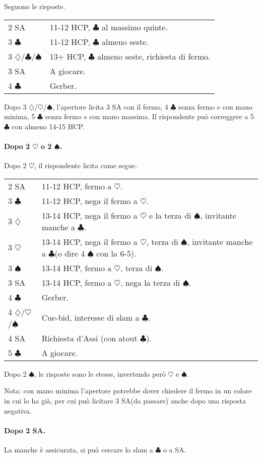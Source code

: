 \documentclass[a4paper,10pt]{article}
\renewcommand{\c}{$\clubsuit$\xspace}
\renewcommand{\d}{$\diamondsuit$\xspace}
\newcommand{\h}{$\heartsuit$\xspace}
\newcommand{\s}{$\spadesuit$\xspace}
\newcommand{\sa}{SA\xspace}
\newcommand{\smallspace}{\vskip0.3cm}
\newenvironment{twocol}
  {\smallspace\noindent\begin{tabular}{l p{0.78\textwidth}}}
  {\end{tabular}\smallspace}
\begin{document}
Seguono le risposte.

\begin{twocol}
	2 \sa & 11-12 HCP, \c al massimo quinte. \\
	3 \c & 11-12 HCP, \c almeno seste. \\
	3 \d/\c/\s & 13+ HCP, \c almeno seste, richiesta di fermo. \\
	3 \sa & A giocare. \\
	4 \c & Gerber.
\end{twocol}

Dopo 3 \d/\h/\s, l'apertore licita 3 \sa con il fermo, 4 \c senza fermo e con mano minima, 5 \c senza fermo e con mano massima. Il rispondente può correggere a 5 \c con almeno 14-15 HCP.

\paragraph{Dopo 2 \h o 2 \s.}

Dopo 2 \h, il rispondente licita come segue.

\begin{twocol}
	2 \sa & 11-12 HCP, fermo a \h. \\
	3 \c & 11-12 HCP, nega il fermo a \h. \\
	3 \d & 13-14 HCP, nega il fermo a \h e la terza di \s, invitante manche a \c. \\
	3 \h & 13-14 HCP, nega il fermo a \h, terza di \s, invitante manche a \c (o dire 4 \s con la 6-5). \\
	3 \s & 13-14 HCP, fermo a \h, terza di \s. \\
	3 \sa & 13-14 HCP, fermo a \h, nega la terza di \s. \\
	4 \c & Gerber. \\
	4 \d/\h/\s & Cue-bid, interesse di slam a \c. \\
	4 \sa & Richiesta d'Assi (con atout \c). \\
	5 \c & A giocare. \\
\end{twocol}

Dopo 2 \s, le risposte sono le stesse, invertendo però \h e \s.

Nota: con mano minima l'apertore potrebbe dover chiedere il fermo in un colore in cui lo ha già, per cui può licitare 3 \sa (da passare) anche dopo una risposta negativa.

\paragraph{Dopo 2 \sa.} La manche è assicurata, si può cercare lo slam a \c o a \sa.
\end{document}
